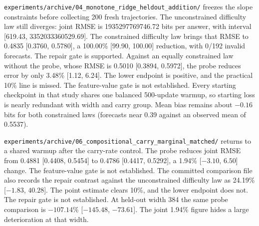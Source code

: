 \texttt{experiments/archive/04\_monotone\_ridge\_heldout\_addition/} freezes the slope constraints before collecting 200 fresh trajectories.
The unconstrained difficulty law still diverges: joint RMSE is 1935297769746.72 bits per answer, with interval [619.43, 3352033360529.69].
The constrained difficulty law brings that RMSE to 0.4835 [0.3760, 0.5780], a 100.00\% [99.90, 100.00] reduction, with 0/192 invalid forecasts.
The repair gate is supported.
Against an equally constrained law without the probe, whose RMSE is 0.5010 [0.3894, 0.5972], the probe reduces error by only 3.48\% [1.12, 6.24].
The lower endpoint is positive, and the practical 10\% line is missed.
The feature-value gate is not established.
Every starting checkpoint in that study shares one balanced 500-update warmup, so starting loss is nearly redundant with width and carry group.
Mean bias remains about $-0.16$ bits for both constrained laws (forecasts near 0.39 against an observed mean of 0.5537).

\texttt{experiments/archive/06\_compositional\_carry\_marginal\_matched/} returns to a shared warmup after the carry-rate control.
The probe reduces joint RMSE from 0.4881 [0.4408, 0.5454] to 0.4786 [0.4417, 0.5292], a 1.94\% [$-3.10$, $6.50$] change.
The feature-value gate is not established.
The committed comparison file also records the repair contrast against the unconstrained difficulty law as 24.19\% [$-1.83$, $40.28$].
The point estimate clears 10\%, and the lower endpoint does not.
The repair gate is not established.
At held-out width 384 the same probe comparison is $-107.14\%$ [$-145.48$, $-73.61$].
The joint 1.94\% figure hides a large deterioration at that width.

